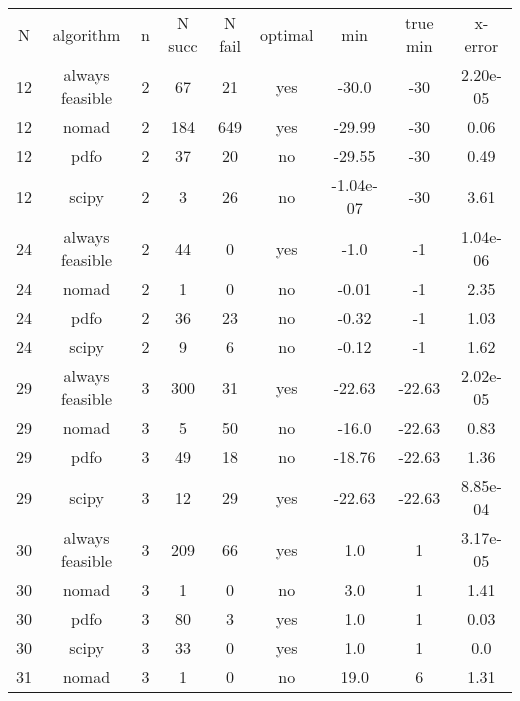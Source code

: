 
\begin{scriptsize}
\begin{center}
\begin{longtable}{ccccccccc}
\label{nonlinear_results}
  N &       algorithm &  n & N succ & N fail & optimal &         min &    true min &  x-error\\
 12 & always feasible &  2 &     67 &     21 &     yes &       -30.0 &         -30 & 2.20e-05\\
 12 &           nomad &  2 &    184 &    649 &     yes &      -29.99 &         -30 &     0.06\\
 12 &            pdfo &  2 &     37 &     20 &      no &      -29.55 &         -30 &     0.49\\
 12 &           scipy &  2 &      3 &     26 &      no &   -1.04e-07 &         -30 &     3.61\\
 24 & always feasible &  2 &     44 &      0 &     yes &        -1.0 &          -1 & 1.04e-06\\
 24 &           nomad &  2 &      1 &      0 &      no &       -0.01 &          -1 &     2.35\\
 24 &            pdfo &  2 &     36 &     23 &      no &       -0.32 &          -1 &     1.03\\
 24 &           scipy &  2 &      9 &      6 &      no &       -0.12 &          -1 &     1.62\\
 29 & always feasible &  3 &    300 &     31 &     yes &      -22.63 &      -22.63 & 2.02e-05\\
 29 &           nomad &  3 &      5 &     50 &      no &       -16.0 &      -22.63 &     0.83\\
 29 &            pdfo &  3 &     49 &     18 &      no &      -18.76 &      -22.63 &     1.36\\
 29 &           scipy &  3 &     12 &     29 &     yes &      -22.63 &      -22.63 & 8.85e-04\\
 30 & always feasible &  3 &    209 &     66 &     yes &         1.0 &           1 & 3.17e-05\\
 30 &           nomad &  3 &      1 &      0 &      no &         3.0 &           1 &     1.41\\
 30 &            pdfo &  3 &     80 &      3 &     yes &         1.0 &           1 &     0.03\\
 30 &           scipy &  3 &     33 &      0 &     yes &         1.0 &           1 &      0.0\\
 31 &           nomad &  3 &      1 &      0 &      no &        19.0 &           6 &     1.31\\

\end{longtable}
\end{center}
\end{scriptsize}
